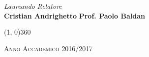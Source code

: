 \documentclass[a4paper, 12pt, twoside, openright]{book}
\begin{document}
\begin{titlepage}
\vfill
\begin{normalsize}
\begin{flushleft}
  \hspace{45pt} \textit{Laureando} \hspace{160pt} \textit{Relatore}\\
  \vspace{5pt}
  \hspace{30pt} \large{\textbf{Cristian Andrighetto}} \hspace{70pt} \large{\textbf{Prof. Paolo Baldan}}\\
  \vspace{10pt}
\end{flushleft}
\end{normalsize}

\vfill
\begin{center}
\hspace{-0.2cm}
\line(1, 0){360}

\textsc{Anno Accademico 2016/2017}
\end{center}
\end{titlepage}

\cleardoublepage %

\thispagestyle{empty} 


\begingroup 
  \makeatletter
  \let\ps@plain\ps@empty
  \makeatother
  \tableofcontents
  \clearpage
\endgroup





\mainmatter






\backmatter

\printglossaries


\end{document}
